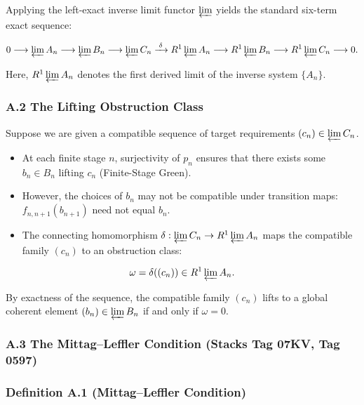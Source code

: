 \documentclass[
  11pt,
]{article}
\providecommand{\tightlist}{%
  \setlength{\itemsep}{0pt}\setlength{\parskip}{0pt}}
\theoremstyle{plain}
\theoremstyle{definition}\newtheorem{definition}[theorem]{Definition}
\theoremstyle{remark}\newtheorem*{remark}{Remark}
\begin{document}
Applying the left-exact inverse limit functor \(\varprojlim\) yields the
standard six-term exact sequence:

\[
0 \longrightarrow \varprojlim A_n \longrightarrow \varprojlim B_n \longrightarrow \varprojlim C_n \xrightarrow{\;\delta\;} R^1 \varprojlim A_n \longrightarrow R^1 \varprojlim B_n \longrightarrow R^1 \varprojlim C_n \longrightarrow 0.
\]

Here, \(R^1 \varprojlim A_n\) denotes the first derived limit of the
inverse system \(\{A_n\}\).

\subsubsection{A.2 The Lifting Obstruction
Class}\label{a.2-the-lifting-obstruction-class}

Suppose we are given a compatible sequence of target requirements
\((c_n) \in \varprojlim C_n\).

\begin{itemize}
\tightlist
\item
  At each finite stage \(n\), surjectivity of \(p_n\) ensures that there
  exists some \(b_n \in B_n\) lifting \(c_n\) (Finite-Stage Green).
\item
  However, the choices of \(b_n\) may not be compatible under transition
  maps: \(f_{n,n+1}(b_{n+1})\) need not equal \(b_n\).
\item
  The connecting homomorphism
  \(\delta: \varprojlim C_n \to R^1 \varprojlim A_n\) maps the
  compatible family \((c_n)\) to an obstruction class:
\end{itemize}

\[
\omega = \delta((c_n)) \in R^1 \varprojlim A_n.
\]

By exactness of the sequence, the compatible family \((c_n)\) lifts to a
global coherent element \((b_n) \in \varprojlim B_n\) if and only if
\(\omega = 0\).

\subsubsection{A.3 The Mittag--Leffler Condition (Stacks Tag 07KV, Tag
0597)}\label{a.3-the-mittagleffler-condition-stacks-tag-07kv-tag-0597}

\subsubsection{Definition A.1 (Mittag--Leffler
Condition)}\label{definition-a.1-mittagleffler-condition}
\end{document}

